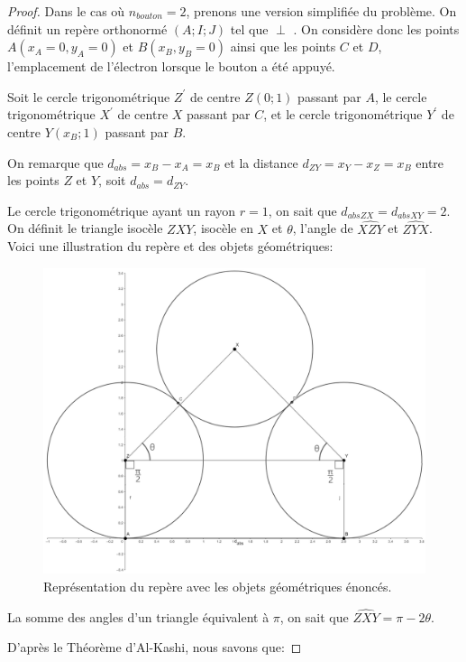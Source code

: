 \documentclass[a4paper]{amsart}
\theoremstyle{definition}
\theoremstyle{remark}
\numberwithin{equation}{section}
\renewcommand*{\overrightarrow}[1]{\vbox{\halign{##\cr 
  \tiny\rightarrowfill\cr\noalign{\nointerlineskip\vskip1pt} 
  $#1\mskip2mu$\cr}}}
\begin{document}
\begin{proof}
  Dans le cas où $n_{bouton}=2$, prenons une version simplifiée du problème. On définit un repère orthonormé $(A;I;J)$ tel que \overrightarrow{AJ} $\perp$ \overrightarrow{AB}. On considère donc les points $A(x_A=0,y_A=0)$ et $B(x_B,y_B=0)$ ainsi que les points $C$ et $D$, l'emplacement de l'électron lorsque le bouton a été appuyé.

  Soit le cercle trigonométrique $Z^\prime$ de centre $Z(0;1)$ passant par $A$, le cercle trigonométrique $X^\prime$ de centre $X$ passant par $C$, et le cercle trigonométrique $Y^\prime$ de centre $Y(x_B;1)$ passant par $B$.

  On remarque que $d_{abs}=x_B-x_A=x_B$ et la distance $d_{ZY}=x_Y-x_Z=x_B$ entre les points $Z$ et $Y$, soit $d_{abs}=d_{ZY}$.

  Le cercle trigonométrique ayant un rayon $r=1$, on sait que $d_{abs ZX}=d_{abs XY}=2$. On définit le triangle isocèle $ZXY$, isocèle en $X$ et $\theta$, l'angle de $\widehat{XZY}$ et $\widehat{ZYX}$. Voici une illustration du repère et des objets géométriques:

  \begin{figure}[H]
    \centering
    \includegraphics[scale=0.2]{images/three_circles.png}
    \caption{Représentation du repère avec les objets géométriques énoncés.}
  \end{figure}

  La somme des angles d'un triangle équivalent à $\pi$, on sait que $\widehat{ZXY}=\pi-2\theta$.

  D'après le Théorème d'Al-Kashi, nous savons que:


\end{proof}
\end{document}

